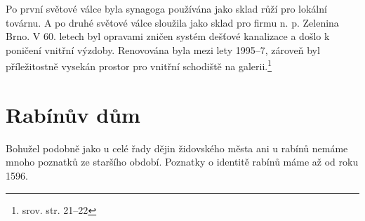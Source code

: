 \documentclass[a4paper,oneside,12pt]{report}
\begin{document}
Po první světové válce byla synagoga používána jako sklad růží pro lokální továrnu.
A po druhé světové válce sloužila jako sklad pro firmu n. p. Zelenina Brno.
V 60. letech byl opravami zničen systém dešťové kanalizace a došlo k poničení vnitřní výzdoby.
Renovována byla mezi lety 1995--7, zároveň byl příležitostně vysekán prostor pro vnitřní schodiště na galerii.\footnote{srov. \cite{Hanackova2008} str. 21--22}

\section{Rabínův dům}

Bohužel podobně jako u celé řady dějin židovského města ani u rabínů nemáme mnoho poznatků ze staršího období.
Poznatky o identitě rabínů máme až od roku 1596.
\end{document}
